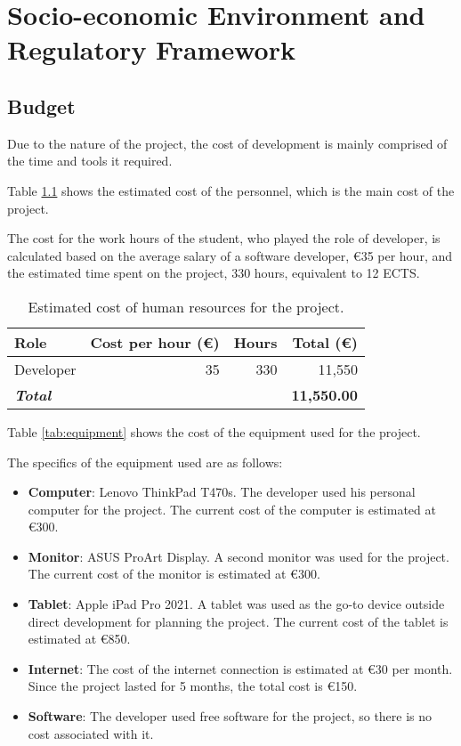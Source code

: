 \chapter[Socio-economic Environment \& Regulatory Framework]{Socio-economic Environment and Regulatory Framework}\label{chap:planning}

\section{Budget}\label{sec:budget}

Due to the nature of the project, the cost of development is mainly comprised of the time and tools it required. 

Table \ref{tab:human-resources} shows the estimated cost of the personnel, which is the main cost of the project.

The cost for the work hours of the student, who played the role of developer, is calculated based on the average salary of a software developer, €35 per hour, and the estimated time spent on the project, 330 hours, equivalent to 12 ECTS.

\begin{table}[H]
    \begin{tabular}{l r r r}
        \hline
        \textbf{Role} & \textbf{Cost per hour (€)} & \textbf{Hours} & \textbf{Total (€)} \\
        \hline
        Developer & 35 & 330 & 11,550 \\
        \hline
        \textbf{\textit{Total}} & & & \textbf{11,550.00} \\
        \hline
    \end{tabular}
    \caption{Estimated cost of human resources for the project.}
    \label{tab:human-resources}
\end{table}

Table \ref{tab:equipment} shows the cost of the equipment used for the project.

The specifics of the equipment used are as follows:

\begin{itemize}
    \item \textbf{Computer}: Lenovo ThinkPad T470s. The developer used his personal computer for the project. The current cost of the computer is estimated at €300.
    \item \textbf{Monitor}: ASUS ProArt Display. A second monitor was used for the project. The current cost of the monitor is estimated at €300.
    \item \textbf{Tablet}: Apple iPad Pro 2021. A tablet was used as the go-to device outside direct development for planning the project. The current cost of the tablet is estimated at €850.
    \item \textbf{Internet}: The cost of the internet connection is estimated at €30 per month. Since the project lasted for 5 months, the total cost is €150.
    \item \textbf{Software}: The developer used free software for the project, so there is no cost associated with it.
\end{itemize}

